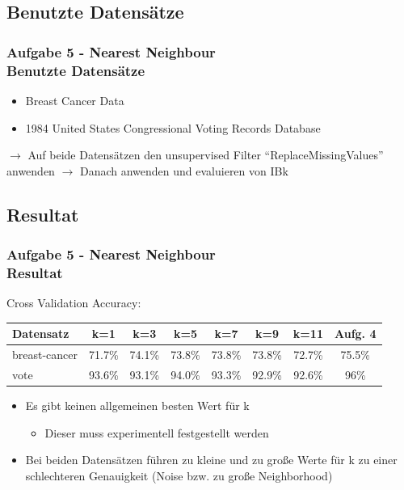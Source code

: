 \documentclass[accentcolor=tud6b,colorbacktitle,inverttitle,landscape,german,presentation,t]{tudbeamer}
\begin{document}
    \subsection{Benutzte Datensätze}
    
    \begin{frame}[t]
    \frametitle{Aufgabe 5 - Nearest Neighbour\\ Benutzte Datensätze}
        \begin{itemize}
            \item Breast Cancer Data
            \item 1984 United States Congressional Voting Records Database
        \end{itemize}
        \vfill
        $\rightarrow$ Auf beide Datensätzen den unsupervised Filter ``ReplaceMissingValues'' anwenden 
        $\rightarrow$ Danach anwenden und evaluieren von IBk
    \end{frame}
    
    \subsection{Resultat}
    
    \begin{frame}[t]
    \frametitle{Aufgabe 5 - Nearest Neighbour\\ Resultat}
        Cross Validation Accuracy:
        \vfill
        \begin{tabular}[htbp]{l||c|c|c|c|c|c|c}
            Datensatz & k=1 & k=3 & k=5 & k=7 & k=9 & k=11 & Aufg. 4 \\
            \hline
            \hline
            breast-cancer & 71.7\% & 74.1\% & 73.8\% & 73.8\% & 73.8\% & 72.7\% & 75.5\% \\
            \hline
            vote & 93.6\% & 93.1\% & 94.0\% & 93.3\% & 92.9\% & 92.6\% & 96\% \\
        \end{tabular}
        \vfill
\begin{itemize}
       \item Es gibt keinen allgemeinen besten Wert für k
\begin{itemize}
\item Dieser muss experimentell festgestellt werden
\end{itemize}
        \item  Bei beiden Datensätzen führen zu kleine und zu große Werte für k zu einer schlechteren Genauigkeit (Noise bzw. zu große Neighborhood)\\
\end{itemize}
    \end{frame}
    
\end{document}
